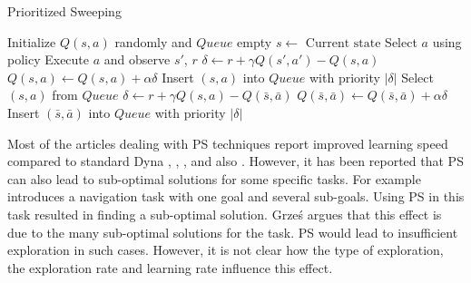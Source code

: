 \begin{algorithm}[ht]
	\caption{Prioritized Sweeping} \label{alg:PS}
	\begin{algorithmic}[1]
		\State Initialize $Q(s,a)$ randomly and $Queue$ empty
			\State $s\gets \textrm{ Current state}$
			\State Select $a$ using policy
			\State Execute $a$ and observe $s'$, $r$
			\State $\delta \gets r + \gamma Q(s',a') - Q(s,a)$
			\State $Q(s,a) \gets Q(s,a) + \alpha \delta$
			\State Insert $(s,a)$ into $Queue$ with priority $| \delta |$
				\State Select $(s,a)$ from $Queue$
					\label{alg:PS_DetermineLeadInStates}
						\State $\delta \gets r + \gamma Q(s,a) - Q(\bar{s},\bar{a})$
						\State $Q(\bar{s},\bar{a}) \gets Q(\bar{s},\bar{a}) + \alpha \delta$
						\State Insert $(\bar{s},\bar{a})$ into $Queue$ with priority $| \delta |$
					\EndFor
			\EndLoop
		\EndFor
	\end{algorithmic}
\end{algorithm}

Most of the articles dealing with \ac{PS} techniques report improved learning speed compared to standard Dyna \cite{MooreAtkeson:93}, \cite{PengWilliams:93}, \cite{Rayner:07}, and also \cite{Wingate:05}. However, it has been reported that \ac{PS} can also lead to sub-optimal solutions for some specific tasks. For example \cite{Grzes:08} introduces a navigation task with one goal and several sub-goals. Using \ac{PS} in this task resulted in finding a sub-optimal solution. Grze\'{s} argues that this effect is due to the many sub-optimal solutions for the task. \ac{PS} would lead to insufficient exploration in such cases. However, it is not clear how the type of exploration, the exploration rate and learning rate influence this effect. 

